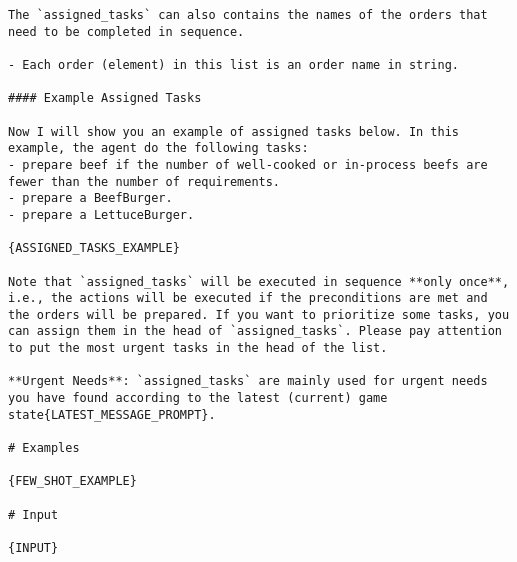 \begin{lstlisting}
The `assigned_tasks` can also contains the names of the orders that need to be completed in sequence.

- Each order (element) in this list is an order name in string.

#### Example Assigned Tasks

Now I will show you an example of assigned tasks below. In this example, the agent do the following tasks:
- prepare beef if the number of well-cooked or in-process beefs are fewer than the number of requirements.
- prepare a BeefBurger.
- prepare a LettuceBurger.

{ASSIGNED_TASKS_EXAMPLE}

Note that `assigned_tasks` will be executed in sequence **only once**, i.e., the actions will be executed if the preconditions are met and the orders will be prepared. If you want to prioritize some tasks, you can assign them in the head of `assigned_tasks`. Please pay attention to put the most urgent tasks in the head of the list.

**Urgent Needs**: `assigned_tasks` are mainly used for urgent needs you have found according to the latest (current) game state{LATEST_MESSAGE_PROMPT}.

# Examples

{FEW_SHOT_EXAMPLE}

# Input

{INPUT}


\end{lstlisting}

